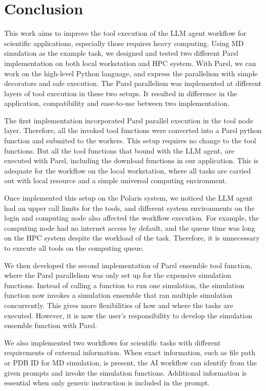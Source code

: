 \section{Conclusion}
This work aims to improve the tool execution of the LLM agent workflow for scientific applications, especially those requires heavy computing. 
Using MD simulation as the example task, we designed and tested two different Parsl implementation on both local workstation and HPC system. 
With Parsl, we can work on the high-level Python language, and express the parallelism with simple decorators and safe execution. 
The Parsl parallelism was implemented at different layers of tool execution in these two setups.  
It resulted in difference in the application, compatibility and ease-to-use between two implementation. 

The first implementation incorporated Parsl parallel execution in the tool node layer. 
Therefore, all the invoked tool functions were converted into a Parsl python function and submited to the workers. 
This setup requires no change to the tool functions. 
But all the tool functions that bound with the LLM agent, are executed with Parsl, including the download functions in our application. 
This is adequate for the workflow on the local workstation, where all tasks are carried out with local resource and a simple universal computing environment. 

Once implemented this setup on the Polaris system, we noticed the LLM agent had an upper call limits for the tools, and different system environments on the login and computing node also affected the workflow execution. 
For example, the computing node had no internet access by default, and the queue time was long on the HPC system despite the workload of the task. 
Therefore, it is unnecessary to execute all tools on the computing queue. 

We then developed the second implementation of Parsl ensemble tool function, where the Parsl parallelism was only set up for the expensive simulation functions. 
Instead of calling a function to run one simulation, the simulation function now invokes a simulation ensemble that ran multiple simulation concurrently. 
This gives more flexibilities of how and where the tasks are executed. 
However, it is now the user's responsibility to develop the simulation ensemble function with Parsl. 

We also implemented two workflows for scientific tasks with different requirements of external information. 
When exact information, such as file path or PDB ID for MD simulation, is present, the AI workflow can identify from the given prompts and invoke the simulation functions. 
Additional information is essential when only generic instruction is included in the prompt. 


